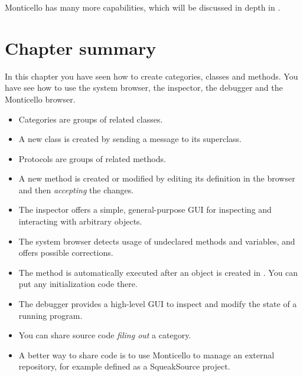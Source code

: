 \documentclass[a4paper,10pt,twoside]{book}
\begin{document}
Monticello has many more capabilities, which will be discussed in depth in .

\section{Chapter summary}
In this chapter you have seen how to create categories, classes and methods.  You have see how to use the system browser, the inspector, the debugger and the Monticello browser.

\begin{itemize}
  \item Categories are groups of related classes.
  \item A new class is created by sending a message to its superclass.
  \item Protocols are groups of related methods.
  \item A new method is created or modified by editing its definition in the browser and then \emph{accepting} the changes.
  \item The inspector offers a simple, general-purpose GUI for inspecting and interacting with arbitrary objects.
  \item The system browser detects usage of undeclared methods and variables, and offers possible corrections.
  \item The  method is automatically executed after an object is created in \squeak. You can put any initialization code there.
  \item The debugger provides a high-level GUI to inspect and modify the state of a running program.
  \item You can share source code \emph{filing out} a category.
  \item A better way to share code is to use Monticello to manage an external repository, for example defined as a SqueakSource project.
\end{itemize}

\ifx\wholebook\relax\else
\end{document}
